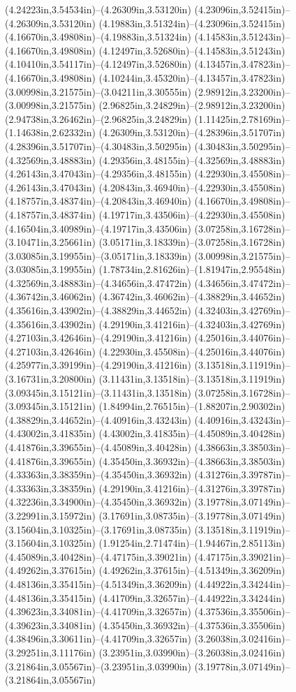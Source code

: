 (4.24223in,3.54534in)--(4.26309in,3.53120in) (4.23096in,3.52415in)--(4.26309in,3.53120in) (4.19883in,3.51324in)--(4.23096in,3.52415in) (4.16670in,3.49808in)--(4.19883in,3.51324in) (4.14583in,3.51243in)--(4.16670in,3.49808in) (4.12497in,3.52680in)--(4.14583in,3.51243in) (4.10410in,3.54117in)--(4.12497in,3.52680in) (4.13457in,3.47823in)--(4.16670in,3.49808in) (4.10244in,3.45320in)--(4.13457in,3.47823in) (3.00998in,3.21575in)--(3.04211in,3.30555in) (2.98912in,3.23200in)--(3.00998in,3.21575in) (2.96825in,3.24829in)--(2.98912in,3.23200in) (2.94738in,3.26462in)--(2.96825in,3.24829in) (1.11425in,2.78169in)--(1.14638in,2.62332in) (4.26309in,3.53120in)--(4.28396in,3.51707in) (4.28396in,3.51707in)--(4.30483in,3.50295in) (4.30483in,3.50295in)--(4.32569in,3.48883in) (4.29356in,3.48155in)--(4.32569in,3.48883in) (4.26143in,3.47043in)--(4.29356in,3.48155in) (4.22930in,3.45508in)--(4.26143in,3.47043in) (4.20843in,3.46940in)--(4.22930in,3.45508in) (4.18757in,3.48374in)--(4.20843in,3.46940in) (4.16670in,3.49808in)--(4.18757in,3.48374in) (4.19717in,3.43506in)--(4.22930in,3.45508in) (4.16504in,3.40989in)--(4.19717in,3.43506in) (3.07258in,3.16728in)--(3.10471in,3.25661in) (3.05171in,3.18339in)--(3.07258in,3.16728in) (3.03085in,3.19955in)--(3.05171in,3.18339in) (3.00998in,3.21575in)--(3.03085in,3.19955in) (1.78734in,2.81626in)--(1.81947in,2.95548in) (4.32569in,3.48883in)--(4.34656in,3.47472in) (4.34656in,3.47472in)--(4.36742in,3.46062in) (4.36742in,3.46062in)--(4.38829in,3.44652in) (4.35616in,3.43902in)--(4.38829in,3.44652in) (4.32403in,3.42769in)--(4.35616in,3.43902in) (4.29190in,3.41216in)--(4.32403in,3.42769in) (4.27103in,3.42646in)--(4.29190in,3.41216in) (4.25016in,3.44076in)--(4.27103in,3.42646in) (4.22930in,3.45508in)--(4.25016in,3.44076in) (4.25977in,3.39199in)--(4.29190in,3.41216in) (3.13518in,3.11919in)--(3.16731in,3.20800in) (3.11431in,3.13518in)--(3.13518in,3.11919in) (3.09345in,3.15121in)--(3.11431in,3.13518in) (3.07258in,3.16728in)--(3.09345in,3.15121in) (1.84994in,2.76515in)--(1.88207in,2.90302in) (4.38829in,3.44652in)--(4.40916in,3.43243in) (4.40916in,3.43243in)--(4.43002in,3.41835in) (4.43002in,3.41835in)--(4.45089in,3.40428in) (4.41876in,3.39655in)--(4.45089in,3.40428in) (4.38663in,3.38503in)--(4.41876in,3.39655in) (4.35450in,3.36932in)--(4.38663in,3.38503in) (4.33363in,3.38359in)--(4.35450in,3.36932in) (4.31276in,3.39787in)--(4.33363in,3.38359in) (4.29190in,3.41216in)--(4.31276in,3.39787in) (4.32236in,3.34900in)--(4.35450in,3.36932in) (3.19778in,3.07149in)--(3.22991in,3.15972in) (3.17691in,3.08735in)--(3.19778in,3.07149in) (3.15604in,3.10325in)--(3.17691in,3.08735in) (3.13518in,3.11919in)--(3.15604in,3.10325in) (1.91254in,2.71474in)--(1.94467in,2.85113in) (4.45089in,3.40428in)--(4.47175in,3.39021in) (4.47175in,3.39021in)--(4.49262in,3.37615in) (4.49262in,3.37615in)--(4.51349in,3.36209in) (4.48136in,3.35415in)--(4.51349in,3.36209in) (4.44922in,3.34244in)--(4.48136in,3.35415in) (4.41709in,3.32657in)--(4.44922in,3.34244in) (4.39623in,3.34081in)--(4.41709in,3.32657in) (4.37536in,3.35506in)--(4.39623in,3.34081in) (4.35450in,3.36932in)--(4.37536in,3.35506in) (4.38496in,3.30611in)--(4.41709in,3.32657in) (3.26038in,3.02416in)--(3.29251in,3.11176in) (3.23951in,3.03990in)--(3.26038in,3.02416in) (3.21864in,3.05567in)--(3.23951in,3.03990in) (3.19778in,3.07149in)--(3.21864in,3.05567in) 